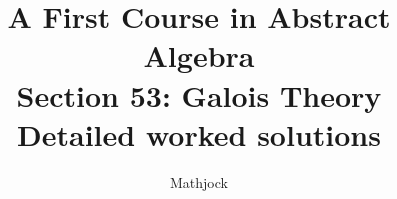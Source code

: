 
\title{\textbf{A First Course in Abstract Algebra}\\[0.3em]Section 53: Galois Theory\\[0.3em]\large Detailed worked solutions}
\author{Mathjock}
\date{}

\maketitle
\bookinfo
\tableofcontents
\clearpage
\renewcommand{\thesection}{53}
\renewcommand{\theHsection}{fraleigh.53}


